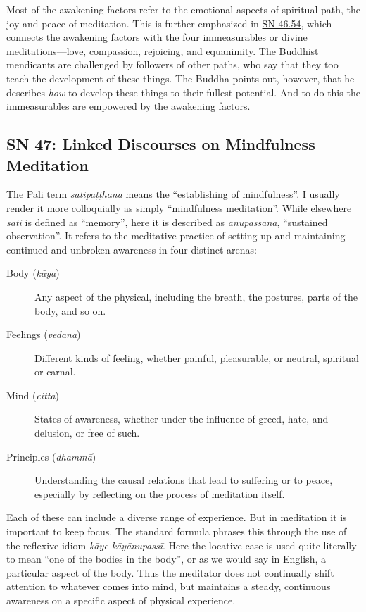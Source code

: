 \documentclass[12pt,openany]{book}%
\begin{document}
Most of the awakening factors refer to the emotional aspects of spiritual path, the joy and peace of meditation. This is further emphasized in \href{https://suttacentral.net/sn46.54}{SN 46.54}, which connects the awakening factors with the four immeasurables or divine meditations—love, compassion, rejoicing, and equanimity. The Buddhist mendicants are challenged by followers of other paths, who say that they too teach the development of these things. The Buddha points out, however, that he describes \emph{how} to develop these things to their fullest potential. And to do this the immeasurables are empowered by the awakening factors.

\subsection*{SN 47: Linked Discourses on Mindfulness Meditation}

The Pali term \textit{\textsanskrit{satipaṭṭhāna}} means the “establishing of mindfulness”. I usually render it more colloquially as simply “mindfulness meditation”. While elsewhere \textit{sati} is defined as “memory”, here it is described as \textit{\textsanskrit{anupassanā}}, “sustained observation”. It refers to the meditative practice of setting up and maintaining continued and unbroken awareness in four distinct arenas:

\begin{description}%
\item[Body (\textit{\textsanskrit{kāya}})] Any aspect of the physical, including the breath, the postures, parts of the body, and so on.%
\item[Feelings (\textit{\textsanskrit{vedanā}})] Different kinds of feeling, whether painful, pleasurable, or neutral, spiritual or carnal.%
\item[Mind (\textit{citta})] States of awareness, whether under the influence of greed, hate, and delusion, or free of such.%
\item[Principles (\textit{\textsanskrit{dhammā}})] Understanding the causal relations that lead to suffering or to peace, especially by reflecting on the process of meditation itself.%
\end{description}

Each of these can include a diverse range of experience. But in meditation it is important to keep focus. The standard formula phrases this through the use of the reflexive idiom \textit{\textsanskrit{kāye} \textsanskrit{kāyānupassī}}. Here the locative case is used quite literally to mean “one of the bodies in the body”, or as we would say in English, a particular aspect of the body. Thus the meditator does not continually shift attention to whatever comes into mind, but maintains a steady, continuous awareness on a specific aspect of physical experience.
\end{document}
